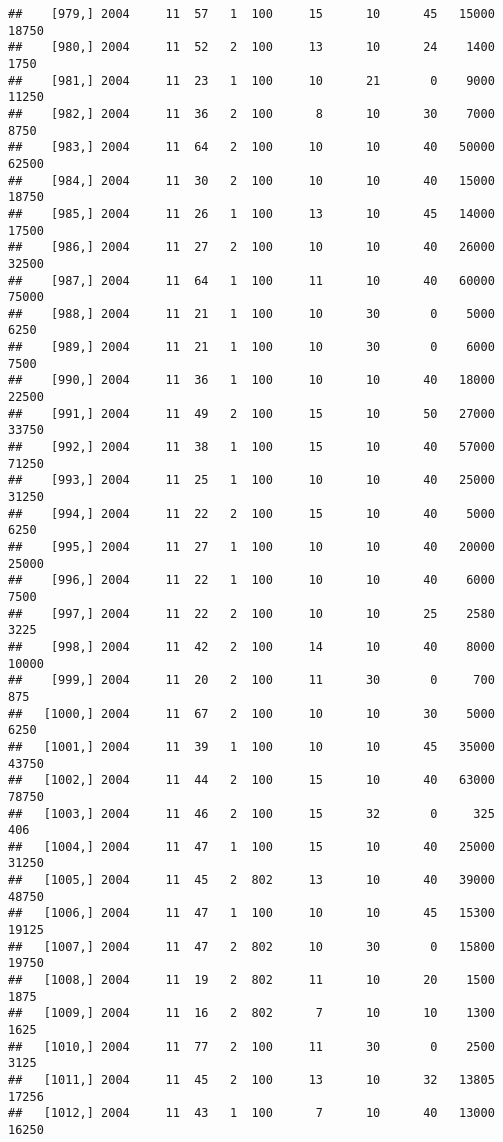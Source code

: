 \documentclass{article}\usepackage[]{graphicx}\usepackage[]{color}
\makeatletter
\newenvironment{kframe}{%
 \def\at@end@of@kframe{}%
 \ifinner\ifhmode%
  \def\at@end@of@kframe{\end{minipage}}%
  \begin{minipage}{\columnwidth}%
 \fi\fi%
 \def\FrameCommand##1{\hskip\@totalleftmargin \hskip-\fboxsep
 \colorbox{shadecolor}{##1}\hskip-\fboxsep
     \hskip-\linewidth \hskip-\@totalleftmargin \hskip\columnwidth}%
 \MakeFramed {\advance\hsize-\width
   \@totalleftmargin\z@ \linewidth\hsize
   \@setminipage}}%
 {\par\unskip\endMakeFramed%
 \at@end@of@kframe}
\newenvironment{knitrout}{}{} %
\makeatother
\begin{document}
\begin{knitrout}
\begin{kframe}
\begin{verbatim}
##    [979,] 2004     11  57   1  100     15      10      45   15000   18750
##    [980,] 2004     11  52   2  100     13      10      24    1400    1750
##    [981,] 2004     11  23   1  100     10      21       0    9000   11250
##    [982,] 2004     11  36   2  100      8      10      30    7000    8750
##    [983,] 2004     11  64   2  100     10      10      40   50000   62500
##    [984,] 2004     11  30   2  100     10      10      40   15000   18750
##    [985,] 2004     11  26   1  100     13      10      45   14000   17500
##    [986,] 2004     11  27   2  100     10      10      40   26000   32500
##    [987,] 2004     11  64   1  100     11      10      40   60000   75000
##    [988,] 2004     11  21   1  100     10      30       0    5000    6250
##    [989,] 2004     11  21   1  100     10      30       0    6000    7500
##    [990,] 2004     11  36   1  100     10      10      40   18000   22500
##    [991,] 2004     11  49   2  100     15      10      50   27000   33750
##    [992,] 2004     11  38   1  100     15      10      40   57000   71250
##    [993,] 2004     11  25   1  100     10      10      40   25000   31250
##    [994,] 2004     11  22   2  100     15      10      40    5000    6250
##    [995,] 2004     11  27   1  100     10      10      40   20000   25000
##    [996,] 2004     11  22   1  100     10      10      40    6000    7500
##    [997,] 2004     11  22   2  100     10      10      25    2580    3225
##    [998,] 2004     11  42   2  100     14      10      40    8000   10000
##    [999,] 2004     11  20   2  100     11      30       0     700     875
##   [1000,] 2004     11  67   2  100     10      10      30    5000    6250
##   [1001,] 2004     11  39   1  100     10      10      45   35000   43750
##   [1002,] 2004     11  44   2  100     15      10      40   63000   78750
##   [1003,] 2004     11  46   2  100     15      32       0     325     406
##   [1004,] 2004     11  47   1  100     15      10      40   25000   31250
##   [1005,] 2004     11  45   2  802     13      10      40   39000   48750
##   [1006,] 2004     11  47   1  100     10      10      45   15300   19125
##   [1007,] 2004     11  47   2  802     10      30       0   15800   19750
##   [1008,] 2004     11  19   2  802     11      10      20    1500    1875
##   [1009,] 2004     11  16   2  802      7      10      10    1300    1625
##   [1010,] 2004     11  77   2  100     11      30       0    2500    3125
##   [1011,] 2004     11  45   2  100     13      10      32   13805   17256
##   [1012,] 2004     11  43   1  100      7      10      40   13000   16250

\end{verbatim}
\end{kframe}
\end{knitrout}
\end{document}
